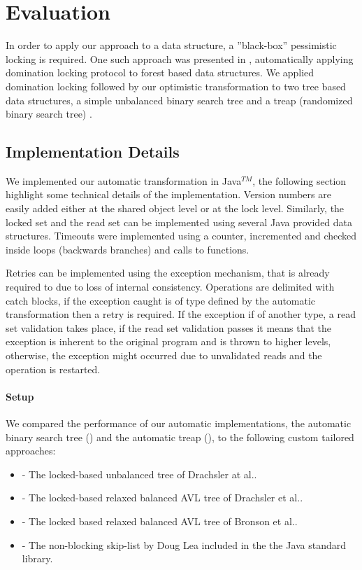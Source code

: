 \section{Evaluation}\label{sec:eval}
In order to apply our approach to a data structure, a
''black-box'' pessimistic locking is required. One such 
approach was presented in \cite{Gueta2011}, automatically 
applying domination locking protocol to forest based data structures.  
We applied domination locking followed by our optimistic 
transformation to two tree based data structures, 
a simple unbalanced binary search tree 
and a treap (randomized binary search tree) \cite{AragonS1989}.


\subsection{Implementation Details}
We implemented our automatic transformation in Java$^{TM}$, 
the following section highlight some technical details of 
the implementation.
Version numbers are easily added either at the shared object level
or at the lock level. Similarly, the locked set and the read set 
can be implemented using several Java provided data structures. 
Timeouts were implemented using a counter, incremented and checked
inside loops (backwards branches) and calls to functions.

Retries can be implemented using the exception mechanism,
that is already required to due to loss of internal consistency. 
Operations are delimited with catch blocks, if the exception caught
is of type defined by the automatic transformation then a retry is required. 
If the exception if of another type, a read set validation takes place, 
if the read set validation passes it means that the exception  is inherent
to the original program and is thrown to higher levels, otherwise, the
exception might occurred due to unvalidated reads and the operation is
restarted. 


\paragraph{Setup}
We compared the performance of our automatic implementations, 
the automatic binary search tree (\autoTree) and the automatic
treap (\autoTreap), to the following custom tailored approaches: 
\begin{itemize}
\item \danaTree - The locked-based 
				unbalanced tree of Drachsler at al.\cite{DrachslerVY2014}. 
\item \danaAVL - The locked-based relaxed balanced AVL tree of 
				Drachsler et al.\cite{DrachslerVY2014}.
\item \bronson - The locked based relaxed balanced AVL tree
				of Bronson et al.\cite{BronsonCCO2010}.
\item \skiplist - The non-blocking skip-list by Doug 
				Lea included in the 
				the Java standard library.
\end{itemize}

